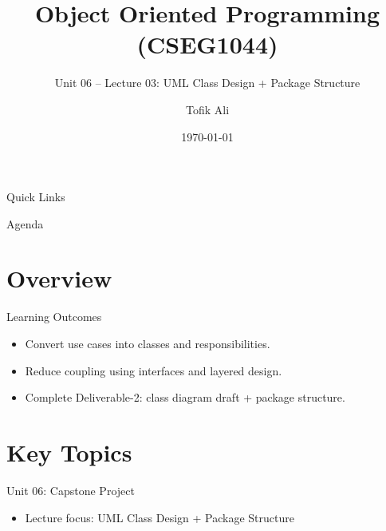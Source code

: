 \documentclass{beamer}
\title[OOPS with Java]{Object Oriented Programming (CSEG1044)}
\subtitle{Unit 06 -- Lecture 03: UML Class Design + Package Structure}
\author{Tofik Ali}
\institute{School of Computer Science, UPES Dehradun}
\date{\today}
\begin{document}
\begin{frame}[fragile]
  \titlepage
  \vspace{0.5em}
  \slidesources{\OOPSUnitVISources}
\end{frame}

\begin{frame}{Quick Links}
  \centering
  \hyperlink{sec:overview}{}\hspace{0.6em}
  \hyperlink{sec:concepts}{}\hspace{0.6em}
  \hyperlink{sec:demo}{}\hspace{0.6em}
  \hyperlink{sec:summary}{}
  \slidesources{\OOPSUnitVISources}
\end{frame}

\begin{frame}{Agenda}
  \tableofcontents
  \slidesources{\OOPSUnitVISources}
\end{frame}

\section{Overview}
\label{sec:overview}

\begin{frame}{Learning Outcomes}
  \begin{itemize}[<+->]
    \item Convert use cases into classes and responsibilities.
    \item Reduce coupling using interfaces and layered design.
    \item Complete Deliverable-2: class diagram draft + package structure.
  \end{itemize}
  \slidesources{\OOPSUnitVISources}
\end{frame}

\section{Key Topics}
\label{sec:concepts}

\begin{frame}{Unit 06: Capstone Project}
  \begin{itemize}[<+->]
    \item Lecture focus: UML Class Design + Package Structure
  \end{itemize}
  \slidesources{\OOPSUnitVISources}
\end{frame}
\end{document}
